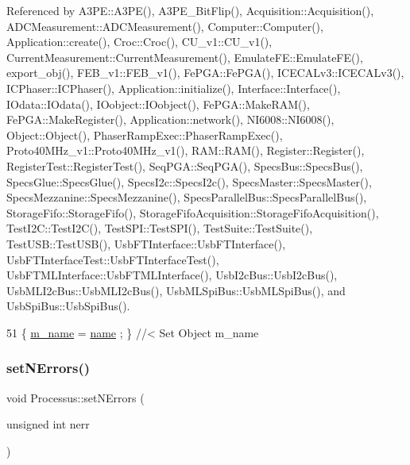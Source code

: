 Referenced by A3\+P\+E\+::\+A3\+P\+E(), A3\+P\+E\+\_\+\+Bit\+Flip(), Acquisition\+::\+Acquisition(), A\+D\+C\+Measurement\+::\+A\+D\+C\+Measurement(), Computer\+::\+Computer(), Application\+::create(), Croc\+::\+Croc(), C\+U\+\_\+v1\+::\+C\+U\+\_\+v1(), Current\+Measurement\+::\+Current\+Measurement(), Emulate\+F\+E\+::\+Emulate\+F\+E(), export\+\_\+obj(), F\+E\+B\+\_\+v1\+::\+F\+E\+B\+\_\+v1(), Fe\+P\+G\+A\+::\+Fe\+P\+G\+A(), I\+C\+E\+C\+A\+Lv3\+::\+I\+C\+E\+C\+A\+Lv3(), I\+C\+Phaser\+::\+I\+C\+Phaser(), Application\+::initialize(), Interface\+::\+Interface(), I\+Odata\+::\+I\+Odata(), I\+Oobject\+::\+I\+Oobject(), Fe\+P\+G\+A\+::\+Make\+R\+A\+M(), Fe\+P\+G\+A\+::\+Make\+Register(), Application\+::network(), N\+I6008\+::\+N\+I6008(), Object\+::\+Object(), Phaser\+Ramp\+Exec\+::\+Phaser\+Ramp\+Exec(), Proto40\+M\+Hz\+\_\+v1\+::\+Proto40\+M\+Hz\+\_\+v1(), R\+A\+M\+::\+R\+A\+M(), Register\+::\+Register(), Register\+Test\+::\+Register\+Test(), Seq\+P\+G\+A\+::\+Seq\+P\+G\+A(), Specs\+Bus\+::\+Specs\+Bus(), Specs\+Glue\+::\+Specs\+Glue(), Specs\+I2c\+::\+Specs\+I2c(), Specs\+Master\+::\+Specs\+Master(), Specs\+Mezzanine\+::\+Specs\+Mezzanine(), Specs\+Parallel\+Bus\+::\+Specs\+Parallel\+Bus(), Storage\+Fifo\+::\+Storage\+Fifo(), Storage\+Fifo\+Acquisition\+::\+Storage\+Fifo\+Acquisition(), Test\+I2\+C\+::\+Test\+I2\+C(), Test\+S\+P\+I\+::\+Test\+S\+P\+I(), Test\+Suite\+::\+Test\+Suite(), Test\+U\+S\+B\+::\+Test\+U\+S\+B(), Usb\+F\+T\+Interface\+::\+Usb\+F\+T\+Interface(), Usb\+F\+T\+Interface\+Test\+::\+Usb\+F\+T\+Interface\+Test(), Usb\+F\+T\+M\+L\+Interface\+::\+Usb\+F\+T\+M\+L\+Interface(), Usb\+I2c\+Bus\+::\+Usb\+I2c\+Bus(), Usb\+M\+L\+I2c\+Bus\+::\+Usb\+M\+L\+I2c\+Bus(), Usb\+M\+L\+Spi\+Bus\+::\+Usb\+M\+L\+Spi\+Bus(), and Usb\+Spi\+Bus\+::\+Usb\+Spi\+Bus().


\begin{DoxyCode}
51 \{ \hyperlink{classObject_a8b83c95c705d2c3ba0d081fe1710f48d}{m\_name}  = \hyperlink{classObject_a300f4c05dd468c7bb8b3c968868443c1}{name}  ; \} \textcolor{comment}{//< Set Object m\_name}
\end{DoxyCode}
\mbox{\label{classProcessus_a831b027b9cf18ab56fa6147b5d3055da}} 
\subsubsection{\texorpdfstring{set\+N\+Errors()}{setNErrors()}}
{\footnotesize\ttfamily void Processus\+::set\+N\+Errors (\begin{DoxyParamCaption}\item[{unsigned int}]{nerr }\end{DoxyParamCaption})\hspace{0.3cm}{\ttfamily [inherited]}}

